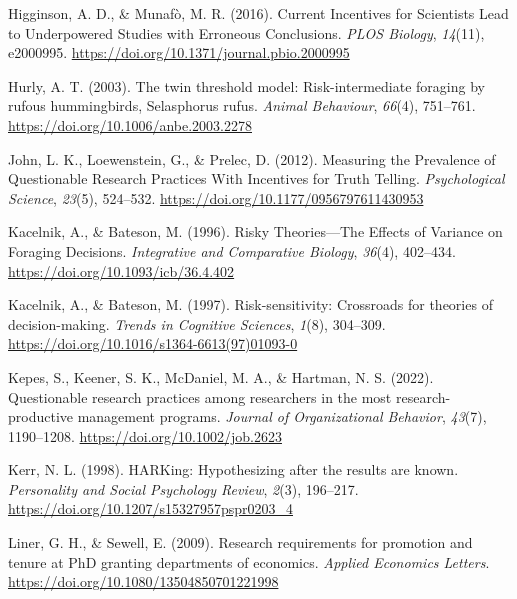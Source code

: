 \documentclass[
  ,man,mask,floatsintext]{apa6}
\newlength{\cslhangindent}
\newlength{\cslentryspacingunit} %
\newenvironment{CSLReferences}[2] %
 {%
  \setlength{\parindent}{0pt}
  \ifodd #1
  \let\oldpar\par
  \def\par{\hangindent=\cslhangindent\oldpar}
  \fi
  \setlength{\parskip}{#2\cslentryspacingunit}
 }%
 {}
\begin{document}
\begin{CSLReferences}{1}{0}
\leavevmode{}%
Higginson, A. D., \& Munafò, M. R. (2016). Current {Incentives} for {Scientists Lead} to {Underpowered Studies} with {Erroneous Conclusions}. \emph{PLOS Biology}, \emph{14}(11), e2000995. \url{https://doi.org/10.1371/journal.pbio.2000995}

\leavevmode{}%
Hurly, A. T. (2003). The twin threshold model: Risk-intermediate foraging by rufous hummingbirds, {Selasphorus} rufus. \emph{Animal Behaviour}, \emph{66}(4), 751--761. \url{https://doi.org/10.1006/anbe.2003.2278}

\leavevmode{}%
John, L. K., Loewenstein, G., \& Prelec, D. (2012). Measuring the {Prevalence} of {Questionable Research Practices With Incentives} for {Truth Telling}. \emph{Psychological Science}, \emph{23}(5), 524--532. \url{https://doi.org/10.1177/0956797611430953}

\leavevmode{}%
Kacelnik, A., \& Bateson, M. (1996). Risky {Theories}---{The Effects} of {Variance} on {Foraging Decisions}. \emph{Integrative and Comparative Biology}, \emph{36}(4), 402--434. \url{https://doi.org/10.1093/icb/36.4.402}

\leavevmode{}%
Kacelnik, A., \& Bateson, M. (1997). Risk-sensitivity: Crossroads for theories of decision-making. \emph{Trends in Cognitive Sciences}, \emph{1}(8), 304--309. \url{https://doi.org/10.1016/s1364-6613(97)01093-0}

\leavevmode{}%
Kepes, S., Keener, S. K., McDaniel, M. A., \& Hartman, N. S. (2022). Questionable research practices among researchers in the most research-productive management programs. \emph{Journal of Organizational Behavior}, \emph{43}(7), 1190--1208. \url{https://doi.org/10.1002/job.2623}

\leavevmode{}%
Kerr, N. L. (1998). {HARKing}: {Hypothesizing} after the results are known. \emph{Personality and Social Psychology Review}, \emph{2}(3), 196--217. \url{https://doi.org/10.1207/s15327957pspr0203_4}

\leavevmode{}%
Liner, G. H., \& Sewell, E. (2009). Research requirements for promotion and tenure at {PhD} granting departments of economics. \emph{Applied Economics Letters}. \url{https://doi.org/10.1080/13504850701221998}


\end{CSLReferences}
\end{document}

